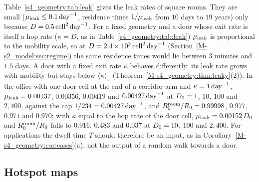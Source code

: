 Table~\ref{s4_geometry:tab:leak} gives the leak rates of square rooms. They are small ($\mu_{\mathrm{leak}}\le0.1\,\mathrm{day}^{-1}$, residence times $1/\mu_{\mathrm{leak}}$ from
$10$ days to $19$ years) only because $D=0.5\,\mathrm{cell}^2\,\mathrm{day}^{-1}$. For a fixed geometry and a door whose exit rate is itself
a hop rate ($\kappa=D$, as in Table~\ref{s4_geometry:tab:leak}) $\mu_{\mathrm{leak}}$ is proportional to the mobility scale, so at
$D=2.4\times10^{3}\,\mathrm{cell}^2\,\mathrm{day}^{-1}$ (Section~\ref{M-s2_model:sec:regime}) the same residence times
would lie between $3$ minutes and $1.5$ days. A door with a fixed exit rate $\kappa$ behaves differently: its
leak rate grows with mobility but stays below $\langle\kappa\rangle_\pi$
(Theorem~\ref{M-s4_geometry:thm:leaky}(2)). In the office with one door cell at the end of a corridor arm and
$\kappa=1\,\mathrm{day}^{-1}$, $\mu_{\mathrm{leak}}=0.00137$, $0.00356$, $0.00419$ and $0.00427\,\mathrm{day}^{-1}$ at $D_0=1$, $10$, $100$ and
$2{,}400$, against the cap $1/234=0.00427\,\mathrm{day}^{-1}$, and $R_0^{\mathrm{room}}/R_0=0.99998$, $0.977$, $0.971$ and $0.970$; with
$\kappa$ equal to the hop rate of the door cell, $\mu_{\mathrm{leak}}=0.00152\,D_0$ and $R_0^{\mathrm{room}}/R_0$ falls to $0.916$,
$0.483$ and $0.037$ at $D_0=10$, $100$ and $2{,}400$. For applications the dwell time $T$ should therefore be an
input, as in Corollary~\ref{M-s4_geometry:cor:cases}(a), not the output of a random walk towards a door.

\subsection{Hotspot maps}\label{appS_geometry:sec:hotspot}

